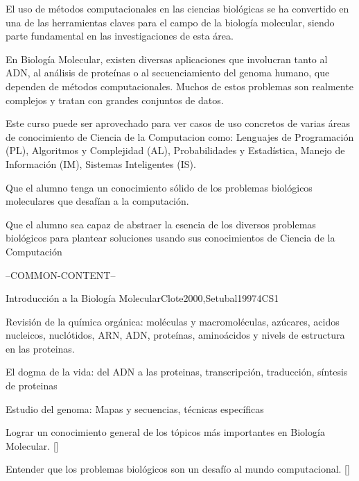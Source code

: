 \begin{syllabus}


\begin{justification}
El uso de métodos computacionales en las ciencias biológicas se ha convertido en una de las herramientas claves para el campo de la biología molecular, siendo parte fundamental en las investigaciones de esta área. 

En Biología Molecular, existen diversas aplicaciones que involucran tanto al ADN, al análisis de proteínas o al secuenciamiento del genoma humano, que dependen de métodos computacionales. Muchos de estos problemas son realmente complejos y tratan con grandes conjuntos de datos. 

Este curso puede ser aprovechado para ver casos de uso concretos de varias áreas de conocimiento de Ciencia de la Computacion como: Lenguajes de Programación (PL), Algoritmos y Complejidad (AL), Probabilidades y Estadística, Manejo de Información (IM), Sistemas Inteligentes (IS).
\end{justification}

\begin{goals}
\item Que el alumno tenga un conocimiento sólido de los problemas biológicos moleculares que desafían a la computación.
\item Que el alumno sea capaz de abstraer la esencia de los diversos problemas biológicos para plantear soluciones usando sus conocimientos de Ciencia de la Computación
\end{goals}

--COMMON-CONTENT--

\begin{unit}{Introducción a la Biología Molecular}{}{Clote2000,Setubal1997}{4}{CS1}
\begin{topics}
    \item Revisión de la química orgánica: moléculas y macromoléculas, azúcares, acidos nucleicos, nuclótidos, ARN, ADN, proteínas, aminoácidos y nivels de estructura en las proteinas. 
    \item El dogma de la vida: del ADN a las proteinas, transcripción, traducción, síntesis de proteinas
    \item Estudio del genoma: Mapas y secuencias, técnicas específicas
\end{topics}
\begin{learningoutcomes}
    \item  Lograr un conocimiento general de los tópicos más importantes en Biología Molecular. [\Familiarity]
    \item Entender que los problemas biológicos son un desafío al mundo computacional. [\Assessment]
\end{learningoutcomes}
\end{unit}


\end{syllabus}
